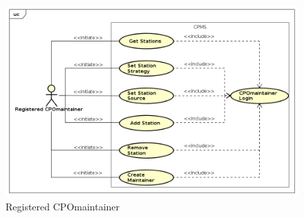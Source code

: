\begin{figure}[!h]
    \includegraphics[keepaspectratio, width=16cm]{UseCase/RegisteredCPOmaintainer.png}
    \caption{Registered \ac{CPO}maintainer}
\end{figure}

\clearpage
